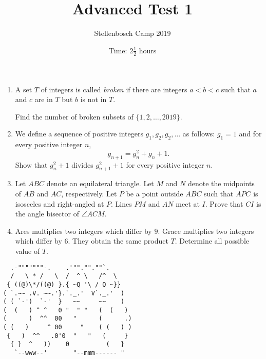 \documentclass{article}
\title{Advanced Test 1}
\author{Stellenbosch Camp 2019}
\date{Time: $2\frac{1}{2}$ hours}
\begin{document}
\maketitle
\thispagestyle{empty}


\begin{enumerate}[1.]

\item %
A set $T$ of integers is called \emph{broken} if there are integers $a < b < c$ such that $a$ and $c$ are in $T$ but $b$ is not in $T$.

Find the number of broken subsets of $\{1, 2, \dotsc, 2019\}$.


\item %
We define a sequence of positive integers $g_1, g_2, g_2, \dotsc$ as follows: $g_1 = 1$ and for every positive integer $n$,
\[ g_{n+1} = g_n^2 +g_n +1. \]
Show that $g_n^2+1$ divides $g_{n+1}^2+1$ for every positive integer $n$.


\item %
Let $ABC$ denote an equilateral triangle.
Let $M$ and $N$ denote the midpoints of $AB$ and $AC$, respectively.
Let $P$ be a point outside $ABC$ such that $APC$ is isosceles and right-angled at $P$.
Lines $PM$ and $AN$ meet at $I$.
Prove that $CI$ is the angle bisector of $\angle ACM$.


\item %
Ares multiplies two integers which differ by $9$.
Grace multiplies two integers which differ by $6$.
They obtain the same product $T$.
Determine all possible value of $T$.

\end{enumerate}


\vfill
\centering
\begin{BVerbatim}
  .-"""""""-.    .'""."".""`.
  /   \ * /   \  /  ^ \   /^  \
 { ((@)\*/((@) }.{ ~Q '\ / Q ~}}
( `.~~ .V. ~~.'}.`._.'  V`._.'  )
( ( `-')  `-'  }   ~~     ~~    )
(  (   ) ^ ^   0 "  " "   (  (   )
(      )  ^^  00   "      (      .)
( (   )     ^ 00     "    ( (   ) )
 {   )  ^^   .0'0  "   "   (     }
  { }  ^   ))    0          (   }
   `--www--'       "--mmm------ "    
\end{BVerbatim}
\end{document}
